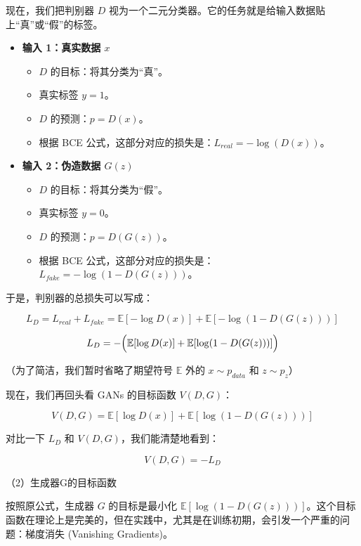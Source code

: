 现在，我们把判别器 \(D\) 视为一个二元分类器。它的任务就是给输入数据贴上``真''或``假''的标签。

\begin{itemize}
\tightlist
\item
  \textbf{输入 1：真实数据 \(x\)}

  \begin{itemize}
  \tightlist
  \item
    \(D\) 的目标：将其分类为``真''。
  \item
    真实标签 \(y=1\)。
  \item
    \(D\) 的预测：\(p=D(x)\)。
  \item
    根据 BCE 公式，这部分对应的损失是：\(L_{real}=-\log(D(x))\)。
  \end{itemize}
\item
  \textbf{输入 2：伪造数据 \(G(z)\)}

  \begin{itemize}
  \tightlist
  \item
    \(D\) 的目标：将其分类为``假''。
  \item
    真实标签 \(y=0\)。
  \item
    \(D\) 的预测：\(p=D(G(z))\)。
  \item
    根据 BCE 公式，这部分对应的损失是：\(L_{fake}=-\log(1-D(G(z)))\)。
  \end{itemize}
\end{itemize}

于是，判别器的总损失可以写成：

\[
L_D = L_{real} + L_{fake} = \mathbb{E}[-\log D(x)] + \mathbb{E}[-\log(1-D(G(z)))]
\]

\[
L_D = -\Bigl(\mathbb{E}[\log D(x)] + \mathbb{E}[\log(1-D(G(z)))]\Bigr)
\]

（为了简洁，我们暂时省略了期望符号 \(\mathbb{E}\) 外的 \(x\sim p_{data}\) 和 \(z\sim p_z\)）

现在，我们再回头看 GANs 的目标函数 \(V(D,G)\)：

\[
V(D,G)=\mathbb{E}[\log D(x)] + \mathbb{E}[\log(1-D(G(z)))]
\]

对比一下 \(L_D\) 和 \(V(D,G)\)，我们能清楚地看到：

\[
V(D,G) = -L_D
\]

（2）生成器G的目标函数

按照原公式，生成器 \(G\) 的目标是最小化 \(\mathbb{E}[\log(1-D(G(z)))]\)。这个目标函数在理论上是完美的，但在实践中，尤其是在训练初期，会引发一个严重的问题：梯度消失 (Vanishing Gradients)。

